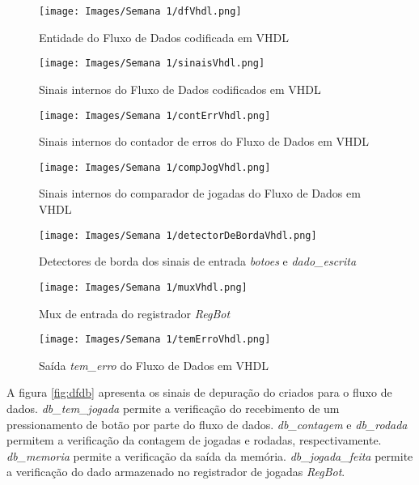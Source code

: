 \documentclass[amsmath,amssymb,floatfix]{report}
\begin{document}
\begin{figure}[H]
    \centering
    \texttt{[image: Images/Semana 1/dfVhdl.png]}
    \caption{Entidade do Fluxo de Dados codificada em VHDL}
    \label{fig:dfVhdl}
\end{figure}

\begin{figure}[H]
    \centering
    \texttt{[image: Images/Semana 1/sinaisVhdl.png]}
    \caption{Sinais internos do Fluxo de Dados codificados em VHDL}
    \label{fig:sinaisVhdl}
\end{figure}

\begin{figure}[H]
    \centering
    \texttt{[image: Images/Semana 1/contErrVhdl.png]}
    \caption{Sinais internos do contador de erros do Fluxo de Dados em VHDL}
    \label{fig:contErrVhdl}
\end{figure}

\begin{figure}[H]
    \centering
    \texttt{[image: Images/Semana 1/compJogVhdl.png]}
    \caption{Sinais internos do comparador de jogadas do Fluxo de Dados em VHDL}
    \label{fig:compJogVhdl}
\end{figure}

\begin{figure}[H]
    \centering
    \texttt{[image: Images/Semana 1/detectorDeBordaVhdl.png]}
    \caption{Detectores de borda dos sinais de entrada \textit{botoes} e \textit{dado\_escrita}}
    \label{fig:detectoresDeBorda}
\end{figure}

\begin{figure}[H]
    \centering
    \texttt{[image: Images/Semana 1/muxVhdl.png]}
    \caption{Mux de entrada do registrador \textit{RegBot}}
    \label{fig:muxVhdl}
\end{figure}

\begin{figure}[H]
    \centering
    \texttt{[image: Images/Semana 1/temErroVhdl.png]}
    \caption{Saída \textit{tem\_erro} do Fluxo de Dados em VHDL}
    \label{fig:temErroVhdl}
\end{figure}

A figura \ref{fig:dfdb} apresenta os sinais de depuração do criados para o fluxo de dados. \textit{db\_tem\_jogada} permite a verificação do recebimento de um pressionamento de botão por parte do fluxo de dados. \textit{db\_contagem} e \textit{db\_rodada} permitem a verificação da contagem de jogadas e rodadas, respectivamente. \textit{db\_memoria} permite a verificação da saída da memória. \textit{db\_jogada\_feita} permite a verificação do dado armazenado no registrador de jogadas \textit{RegBot}.
\end{document}
